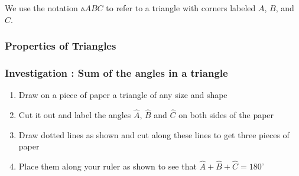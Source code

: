     \addtocounter{footnote}{-0}
    
    \par
  
        \label{m39368*id317683}We use the notation \begin{math}▵ABC\end{math} to refer to a triangle with corners labeled \begin{math}A\end{math}, \begin{math}B\end{math}, and \begin{math}C\end{math}.\par 
        \label{m39368*uid40}
            \subsubsection{ Properties of Triangles}
            \nopagebreak
            
          
\label{m39368*secfhsst!!!underscore!!!id655}
            \subsubsection{  Investigation : Sum of the angles in a triangle }
            \nopagebreak
            
          \label{m39368*id317720}\begin{enumerate}[noitemsep, label=\textbf{\arabic*}. ] 
            \label{m39368*uid41}\item Draw on a piece of paper a triangle of any size and shape
\label{m39368*uid42}\item Cut it out and label the angles \begin{math}\hat{A}\end{math}, \begin{math}\hat{B}\end{math} and \begin{math}\hat{C}\end{math} on both sides of the paper
\label{m39368*uid43}\item Draw dotted lines as shown and cut along these lines to get three pieces of paper
\label{m39368*uid44}\item Place them along your ruler as shown to see that \begin{math}\hat{A}+\hat{B}+\hat{C}={180}^{\circ }\end{math}\end{enumerate}
        

